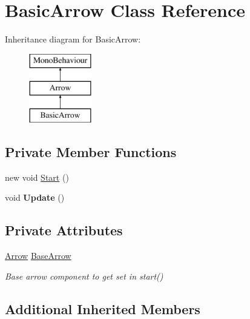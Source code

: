\hypertarget{class_basic_arrow}{}\section{Basic\+Arrow Class Reference}
\label{class_basic_arrow}
Inheritance diagram for Basic\+Arrow\+:\begin{figure}[H]
\begin{center}
\leavevmode
\includegraphics[height=3.000000cm]{class_basic_arrow}
\end{center}
\end{figure}
\subsection*{Private Member Functions}
\begin{DoxyCompactItemize}
\item 
new void \hyperlink{class_basic_arrow_a17d5a6491f2ce81238738282ad62d8ea}{Start} ()
\item 
\mbox{\label{class_basic_arrow_a8167048ebf5b6c8302ea51ab0e44ec5f}} 
void {\bfseries Update} ()
\end{DoxyCompactItemize}
\subsection*{Private Attributes}
\begin{DoxyCompactItemize}
\item 
\mbox{\label{class_basic_arrow_add301fff3d455823b42c2f870885b1f0}} 
\hyperlink{class_arrow}{Arrow} \hyperlink{class_basic_arrow_add301fff3d455823b42c2f870885b1f0}{Base\+Arrow}
\begin{DoxyCompactList}\small\item\em Base arrow component to get set in start() \end{DoxyCompactList}\end{DoxyCompactItemize}
\subsection*{Additional Inherited Members}


